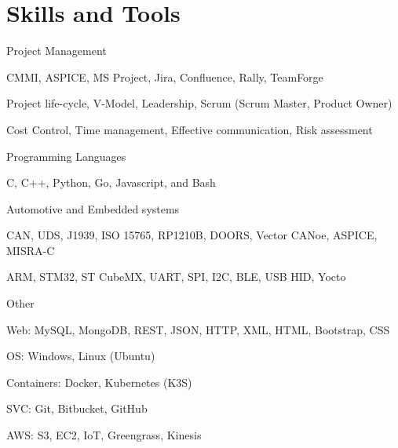 
\section{Skills and Tools}

\skillgroup
    {Project Management}
    {
        \begin{itemize-bullets}
            \item{CMMI, ASPICE, MS Project, Jira, Confluence, Rally, TeamForge}
            \item{Project life-cycle, V-Model, Leadership, Scrum (Scrum Master, Product Owner)}
            \item{Cost Control, Time management, Effective communication, Risk assessment}
        \end{itemize-bullets}
    }

\skillgroup
    {Programming Languages}
    {
        \begin{itemize-bullets}
            \item{C, C++, Python, Go, Javascript, and Bash}
        \end{itemize-bullets}
    }

\skillgroup
    {Automotive and Embedded systems}
    {
        \begin{itemize-bullets}
            \item{CAN, UDS, J1939, ISO 15765, RP1210B, DOORS, Vector CANoe, ASPICE, MISRA-C}
            \item{ARM, STM32, ST CubeMX, UART, SPI, I2C, BLE, USB HID, Yocto}
        \end{itemize-bullets}
    }

\skillgroup
    {Other}
    {
        \begin{itemize-bullets}
            \item{Web: MySQL, MongoDB, REST, JSON, HTTP, XML, HTML, Bootstrap, CSS}
            \item{OS: Windows, Linux (Ubuntu)}
            \item{Containers: Docker, Kubernetes (K3S)}
            \item{SVC: Git, Bitbucket, GitHub}
            \item{AWS: S3, EC2, IoT, Greengrass, Kinesis}
        \end{itemize-bullets}
    }
